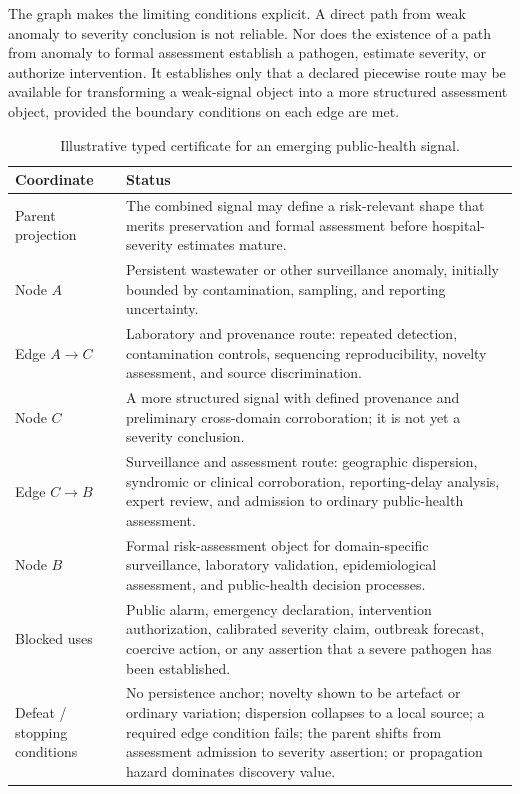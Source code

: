 \documentclass[11pt]{article}
\begin{document}
The graph makes the limiting conditions explicit. A direct path from weak anomaly to severity conclusion is not reliable. Nor does the existence of a path from anomaly to formal assessment establish a pathogen, estimate severity, or authorize intervention. It establishes only that a declared piecewise route may be available for transforming a weak-signal object into a more structured assessment object, provided the boundary conditions on each edge are met.

\begin{table}[htbp]
\centering
\caption{Illustrative typed certificate for an emerging public-health signal.}
\label{tab:public-health}
\small
\begin{tabularx}{\textwidth}{>{\raggedright\arraybackslash}p{}X}
\toprule
Coordinate & Status \\
\midrule
Parent projection & The combined signal may define a risk-relevant shape that merits preservation and formal assessment before hospital-severity estimates mature. \\
Node $A$ & Persistent wastewater or other surveillance anomaly, initially bounded by contamination, sampling, and reporting uncertainty. \\
Edge $A\rightarrow C$ & Laboratory and provenance route: repeated detection, contamination controls, sequencing reproducibility, novelty assessment, and source discrimination. \\
Node $C$ & A more structured signal with defined provenance and preliminary cross-domain corroboration; it is not yet a severity conclusion. \\
Edge $C\rightarrow B$ & Surveillance and assessment route: geographic dispersion, syndromic or clinical corroboration, reporting-delay analysis, expert review, and admission to ordinary public-health assessment. \\
Node $B$ & Formal risk-assessment object for domain-specific surveillance, laboratory validation, epidemiological assessment, and public-health decision processes. \\
Blocked uses & Public alarm, emergency declaration, intervention authorization, calibrated severity claim, outbreak forecast, coercive action, or any assertion that a severe pathogen has been established. \\
Defeat / stopping conditions & No persistence anchor; novelty shown to be artefact or ordinary variation; dispersion collapses to a local source; a required edge condition fails; the parent shifts from assessment admission to severity assertion; or propagation hazard dominates discovery value. \\
\bottomrule
\end{tabularx}
\end{table}
\end{document}
